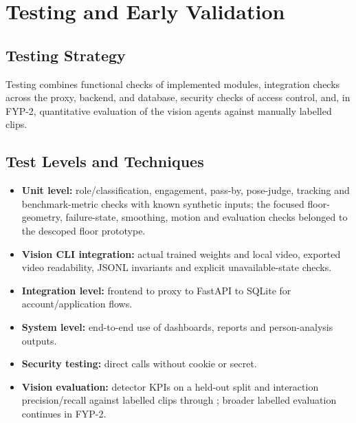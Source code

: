 \chapter{Testing and Early Validation}
\label{ch:testing}
\section{Testing Strategy}
Testing combines functional checks of implemented modules, integration checks across the proxy, backend, and database, security checks of access control, and, in FYP-2, quantitative evaluation of the vision agents against manually labelled clips.

\section{Test Levels and Techniques}
\begin{itemize}
\item \textbf{Unit level:} role/classification, engagement, pass-by, pose-judge, tracking and benchmark-metric checks with known synthetic inputs; the focused floor-geometry, failure-state, smoothing, motion and evaluation checks belonged to the descoped floor prototype.
\item \textbf{Vision CLI integration:} actual trained weights and local video, exported video readability, JSONL invariants and explicit unavailable-state checks.
\item \textbf{Integration level:} frontend to proxy to FastAPI to SQLite for account/application flows.
\item \textbf{System level:} end-to-end use of dashboards, reports and person-analysis outputs.
\item \textbf{Security testing:} direct calls without cookie or secret.
\item \textbf{Vision evaluation:} detector KPIs on a held-out split and interaction precision/recall against labelled clips through ; broader labelled evaluation continues in FYP-2.
\end{itemize}

